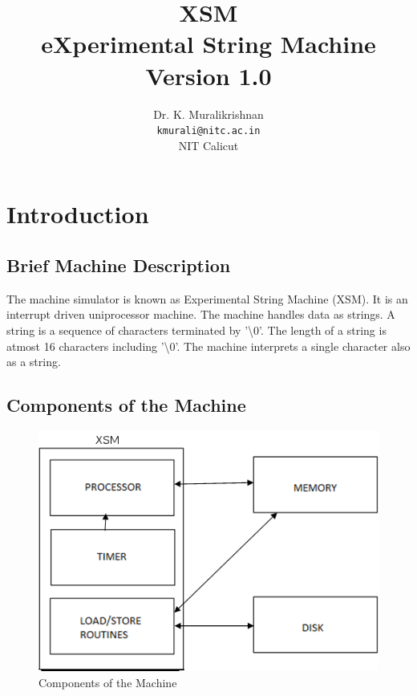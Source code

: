 \documentclass[11pt]{article}
\title{XSM \\ eXperimental String Machine \\
Version 1.0}
\author{Dr. K. Muralikrishnan  \\ \texttt{kmurali@nitc.ac.in} \\ {NIT Calicut} }
\begin{document}
\maketitle
\pagebreak

\thispagestyle{plain}

\tableofcontents
\pagebreak


\section{Introduction}

\subsection{Brief Machine Description}
The machine simulator is known as Experimental String Machine (XSM). It is an interrupt driven uniprocessor machine. The machine handles data as strings. A string is a sequence of characters terminated by '\textbackslash 0'. The length of a string is atmost 16 characters including '\textbackslash 0'. The machine interprets a single character also as a string.

\subsection{Components of the Machine}

\begin{figure}[hbtp]
\begin{center}
\includegraphics[scale=0.5]{block.png}
\end{center}
\caption{Components of the Machine}
\end{figure}
\end{document}

